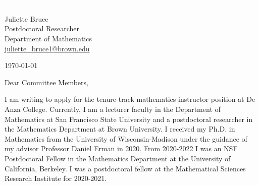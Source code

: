 \documentclass[11pt]{article}
\begin{document}
\section*{}

\noindent
\begin{minipage}{0.99\textwidth}
\begin{minipage}{0.69\textwidth}
\textcolor{white}{.}
\end{minipage}
\begin{minipage}{0.29\textwidth}
{
Juliette Bruce \\
Postdoctoral Researcher \\
Department of Mathematics \\
\href{mailto:juliette\_bruce1@brown.edu}{juliette\_bruce1@brown.edu}
}

\vspace{12pt}
\today
\end{minipage}
\end{minipage}


\vspace{12pt}
\noindent
Dear Committee Members,

I am writing to apply for the tenure-track mathematics instructor position at De Anza College. Currently, I am a lecturer faculty in the Department of Mathematics at San Francisco State University and a postdoctoral researcher in the Mathematics Department at Brown University. I received my Ph.D. in Mathematics from the University of Wisconsin-Madison under the guidance of my advisor Professor Daniel Erman in 2020. From 2020-2022 I was an NSF Postdoctoral Fellow in the Mathematics Department at the University of California, Berkeley. I was a postdoctoral fellow at the Mathematical Sciences Research Institute for 2020-2021.
\end{document}

